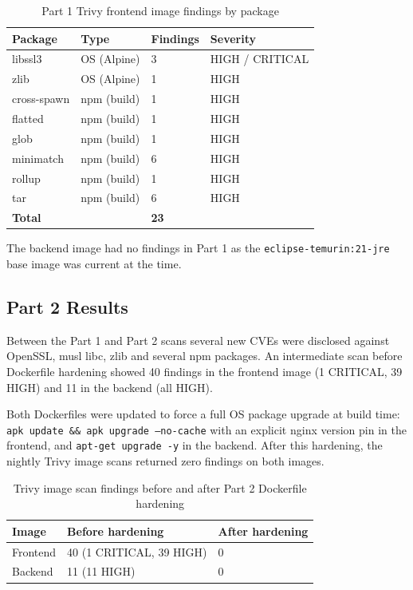 \documentclass[12pt,a4paper]{report}
\begin{document}
\begin{table}[H]
\centering
\caption{Part 1 Trivy frontend image findings by package}
\begin{tabular}{llll}
\toprule
\textbf{Package} & \textbf{Type} & \textbf{Findings} & \textbf{Severity} \\
\midrule
libssl3       & OS (Alpine)   & 3  & HIGH / CRITICAL \\
zlib          & OS (Alpine)   & 1  & HIGH \\
cross-spawn   & npm (build)   & 1  & HIGH \\
flatted       & npm (build)   & 1  & HIGH \\
glob          & npm (build)   & 1  & HIGH \\
minimatch     & npm (build)   & 6  & HIGH \\
rollup        & npm (build)   & 1  & HIGH \\
tar           & npm (build)   & 6  & HIGH \\
\midrule
\textbf{Total} & & \textbf{23} & \\
\bottomrule
\end{tabular}
\end{table}

The backend image had no findings in Part 1 as the \texttt{eclipse-temurin:21-jre} base
image was current at the time.

\subsection{Part 2 Results}

Between the Part 1 and Part 2 scans several new CVEs were disclosed against OpenSSL, musl
libc, zlib and several npm packages. An intermediate scan before Dockerfile hardening showed
40 findings in the frontend image (1 CRITICAL, 39 HIGH) and 11 in the backend (all HIGH).

Both Dockerfiles were updated to force a full OS package upgrade at build time:
\texttt{apk update \&\& apk upgrade --no-cache} with an explicit nginx version pin in the
frontend, and \texttt{apt-get upgrade -y} in the backend. After this hardening, the nightly
Trivy image scans returned zero findings on both images.

\begin{table}[H]
\centering
\caption{Trivy image scan findings before and after Part 2 Dockerfile hardening}
\begin{tabular}{lll}
\toprule
\textbf{Image} & \textbf{Before hardening} & \textbf{After hardening} \\
\midrule
Frontend & 40 (1 CRITICAL, 39 HIGH) & 0 \\
Backend  & 11 (11 HIGH)             & 0 \\
\bottomrule
\end{tabular}
\end{table}
\end{document}
